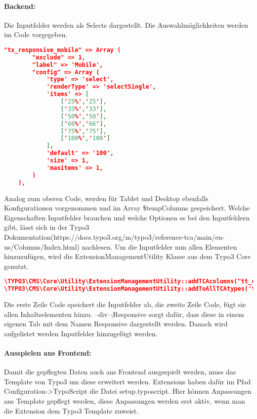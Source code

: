 \paragraph{Backend:} Die Inputfelder werden als Selects dargestellt. Die Auswahlmöglichkeiten werden im Code vorgegeben.
\begin{lstlisting}[language=json,firstnumber=1]
"tx_responsive_mobile" => Array (
        "exclude" => 1,
        "label" => 'Mobile',
        "config" => Array (
            'type' => 'select',
            'renderType' => 'selectSingle',
            'items' => [
                ['25%','25'],
                ['33%','33'],
                ['50%','50'],
                ['66%','66'],
                ['75%','75'],
                ['100%','100']
            ],
            'default' => '100',
            'size' => 1,
            'maxitems' => 1,
        )
    ),
\end{lstlisting}
Analog zum oberen Code, werden für Tablet und Desktop ebenfalls Konfigurationen vorgenommen und im Array \$tempColumns gespeichert. Welche Eigenschaften Inputfelder brauchen und welche Optionen es bei den Inputfeldern gibt, lässt sich in der Typo3 Dokumentation(https://docs.typo3.org/m/typo3/\linebreak reference-tca/main/en-us/Columns/Index.html) nachlesen. Um die Inputfelder nun allen Elementen hinzuzufügen, wird die ExtensionManagementUtility Klasse aus dem Typo3 Core genutzt.
\begin{lstlisting}[language=json,firstnumber=1]
\TYPO3\CMS\Core\Utility\ExtensionManagementUtility::addTCAcolumns("tt_content",$tempColumns,1);
\TYPO3\CMS\Core\Utility\ExtensionManagementUtility::addToAllTCAtypes('tt_content','--div--;Responsive,tx_responsive_mobile,tx_responsive_tablet,tx_responsive_desktop','','after:addToAllTCAtypes');
\end{lstlisting}

Die erste Zeile Code speichert die Inputfelder ab, die zweite Zeile Code, fügt sie allen Inhaltselementen hinzu. --div--;Responsive sorgt dafür, dass diese in einem eigenen Tab mit dem Namen Responsive dargestellt werden. Danach wird aufgelistet werden Inputfelder hinzugefügt werden.

\paragraph{Ausspielen ans Frontend:}

Damit die gepflegten Daten auch ans Frontend ausgespielt werden, muss das Template von Typo3 um diese erweitert werden. Extensions haben dafür im Pfad \linebreak Configuration->TypoScript die Datei setup.typoscript. Hier können Anpassungen ans Template gepflegt werden, diese Anpassungen werden erst aktiv, wenn man die Extension dem Typo3 Template zuweist.

